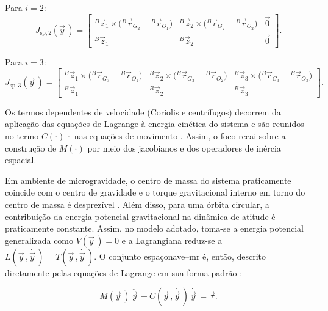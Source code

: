 Para $i=2$:
\begin{equation}
J_{\text{sp},2}(\vec y\, )
=
\begin{bmatrix}
{}^{B}\!\vec z_1 \times \bigl({}^{B}\!\vec r_{G_2}-{}^{B}\!\vec r_{O_1}\bigr) &
{}^{B}\!\vec z_2 \times \bigl({}^{B}\!\vec r_{G_2}-{}^{B}\!\vec r_{O_2}\bigr) &
\vec 0\\[2pt]
{}^{B}\!\vec z_1 &
{}^{B}\!\vec z_2 &
\vec 0
\end{bmatrix}.
\label{eq_Jsp_i2}
\end{equation}

Para $i=3$:
\begin{equation}
J_{\text{sp},3}(\vec y\, )
=
\begin{bmatrix}
{}^{B}\!\vec z_1 \times \bigl({}^{B}\!\vec r_{G_3}-{}^{B}\!\vec r_{O_1}\bigr) &
{}^{B}\!\vec z_2 \times \bigl({}^{B}\!\vec r_{G_3}-{}^{B}\!\vec r_{O_2}\bigr) &
{}^{B}\!\vec z_3 \times \bigl({}^{B}\!\vec r_{G_3}-{}^{B}\!\vec r_{O_3}\bigr)\\[2pt]
{}^{B}\!\vec z_1 &
{}^{B}\!\vec z_2 &
{}^{B}\!\vec z_3
\end{bmatrix}.
\label{eq_Jsp_i3}
\end{equation}

Os termos dependentes de velocidade (Coriolis e centrífugos) decorrem da aplicação
das equações de Lagrange à energia cinética do sistema e são reunidos no termo
$C(\cdot)\,\dot{\cdot}$ nas equações de movimento \cite{Geradin2004,Wilde2018}.
Assim, o foco recai sobre a construção de $M(\cdot)$ por meio dos jacobianos
e dos operadores de inércia espacial.

Em ambiente de microgravidade, o centro de massa do sistema praticamente coincide com o centro de gravidade e o torque gravitacional interno em torno do centro de massa é desprezível \cite{wie2008space}.
Além disso, para uma órbita circular, a contribuição da energia potencial gravitacional na dinâmica de atitude é praticamente constante.
Assim, no modelo adotado, toma-se a energia potencial generalizada como
$V(\vec y\, ) = 0$ e a Lagrangiana reduz-se
a $L(\vec y\, ,\dot{\vec y\, }) = T(\vec y\, ,\dot{\vec y\, })$.
O conjunto espaçonave--\gls{mr} é, então, descrito diretamente pelas equações de Lagrange em sua forma padrão \cite{murray1994mathematical}:

\begin{equation}
M(\vec y\, )\,\ddot{\vec y\, }
+
C(\vec y\, ,\dot{\vec y\, })\,\dot{\vec y\, }
=
\vec\tau.
\label{eq_lagrange_formato_padrao}
\end{equation}

